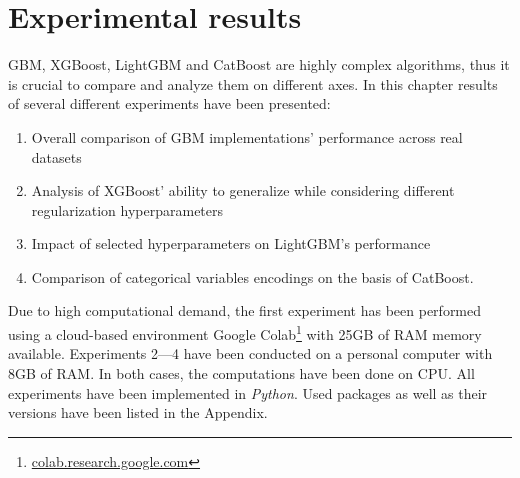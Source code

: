 \documentclass[magisterska, english]{pwr_wmat_praca_dyplomowa}
\theoremstyle{plain}
\numberwithin{theorem}{chapter}
\theoremstyle{definition}
\numberwithin{theorem}{chapter}
\begin{document}
\chapter{Experimental results}\label{chapter:results}
GBM, XGBoost, LightGBM and CatBoost are highly complex algorithms, thus it is crucial to compare and analyze them on different axes. In this chapter results of several different experiments have been presented:
\begin{enumerate}
    \item Overall comparison of GBM implementations' performance across real datasets
    \item Analysis of XGBoost' ability to generalize while considering different regularization hyperparameters
    \item Impact of selected hyperparameters on LightGBM's performance
    \item Comparison of categorical variables encodings on the basis of CatBoost.
\end{enumerate}
Due to high computational demand, the first experiment has been performed using a cloud-based environment Google Colab\footnote{\url{colab.research.google.com}} with 25GB of RAM memory available. Experiments 2---4 have been conducted on a personal computer with 8GB of RAM. In both cases, the computations have been done on CPU. All experiments have been implemented in \emph{Python}. Used packages as well as their versions have been listed in the Appendix.
\end{document}
